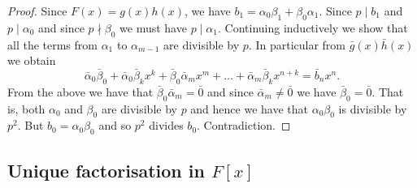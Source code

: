 \documentclass[10pt, a4paper]{article}
\begin{document}
\begin{proposition}
\begin{proof}
        Since $F(x) = g(x)h(x)$,
        we have $b_1 = \alpha_0\beta_1 + \beta_0\alpha_1$.
        Since $p \mid b_1$ and $p \mid \alpha_0$ and since $p \nmid \beta_0$ we must have $p \mid \alpha_1$.
        Continuing inductively we show that all the terms from $\alpha_1$ to $\alpha_{m - 1}$ are divisible by $p$.
        In particular from $\bar{g}(x)\bar{h}(x)$ we obtain
        \[
        \bar{\alpha}_0\bar{\beta}_0 + \bar{\alpha}_0\bar{\beta}_kx ^ k + \bar{\beta}_0\bar{\alpha}_mx ^ m + \dotsc + \bar{\alpha}_m\bar{\beta}_kx ^ {n + k} = \bar{b}_nx ^ n.
        \]
        From the above we have that $\bar{\beta}_0\bar{\alpha}_m = \bar{0}$ and since $\bar{\alpha}_m \neq \bar{0}$ we have $\bar{\beta}_0 = \bar{0}$.
        That is,
        both $\alpha_0$ and $\beta_0$ are divisible by $p$ and hence we have that $\alpha_0\beta_0$ is divisible by $p ^ 2$.
        But $b_0 = \alpha_0\beta_0$ and so $p ^ 2$ divides $b_0$.
        Contradiction.
    \end{proof}
\end{proposition}

\subsection{Unique factorisation in \texorpdfstring{$F[x]$}{}}
\end{document}
